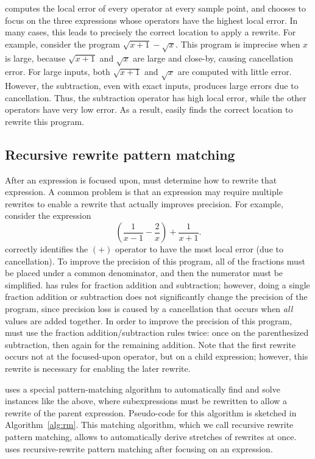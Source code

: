 \documentclass[paper.tex]{subfiles}
\begin{document}
\casio computes the local error of every operator at every sample point,
  and chooses to focus on the three expressions
  whose operators have the highest local error.
In many cases, this leads \casio to precisely the correct location
  to apply a rewrite.
For example, consider the program $\sqrt{x+1} - \sqrt{x}$.
This program is imprecise when $x$ is large,
  because $\sqrt{x+1}$ and $\sqrt{x}$ are large and close-by,
  causing cancellation error.
For large inputs, both $\sqrt{x+1}$ and $\sqrt{x}$
  are computed with little error.
However, the subtraction, even with exact inputs,
  produces large errors due to cancellation.
Thus, the subtraction operator has high local error,
  while the other operators have very low error.
As a result, \casio easily finds the correct location
  to rewrite this program.

\subsection{Recursive rewrite pattern matching}

After an expression is focused upon,
  \casio must determine how to rewrite that expression.
A common problem is that an expression may require multiple rewrites
  to enable a rewrite that actually improves precision.
For example, consider the expression
\[
 \left(\frac{1}{x-1} - \frac{2}{x} \right) + \frac{1}{x+1}.
\]
\casio correctly identifies the $(+)$ operator
  to have the most local error (due to cancellation).
To improve the precision of this program,
  all of the fractions must be placed under a common denominator,
  and then the numerator must be simplified.
\casio has rules for fraction addition and subtraction;
  however, doing a single fraction addition or subtraction
  does not significantly change the precision of the program,
  since precision loss is caused by a cancellation
  that occurs when \emph{all} values are added together.
In order to improve the precision of this program,
  \casio must use the fraction addition/subtraction rules twice:
  once on the parenthesized subtraction,
  then again for the remaining addition.
Note that the first rewrite occurs not at the focused-upon operator,
  but on a child expression; however, this rewrite
  is necessary for enabling the later rewrite.

\casio uses a special pattern-matching algorithm
  to automatically find and solve instances like the above,
  where subexpressions must be rewritten
  to allow a rewrite of the parent expression.
Pseudo-code for this algorithm is sketched in Algorithm~\ref{alg:rm}.
This matching algorithm, which we call recursive rewrite pattern matching,
  allows \casio to automatically derive
  stretches of  rewrites at once.
\casio uses recursive-rewrite pattern matching
  after focusing on an expression.
\end{document}
